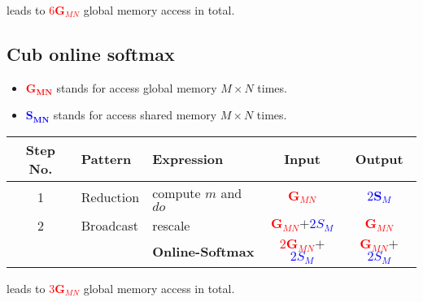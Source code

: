 leads to \textcolor{red}{$6\mathbf{G}_{MN}$} global memory access in total.

\subsection{Cub online softmax}

\begin{itemize}
    \item \textcolor{red}{$\mathbf{G_{MN}}$} stands for access global memory $M\times N$ times.
    \item \textcolor{blue}{$\mathbf{S_{MN}}$} stands for access shared memory $M\times N$ times.
\end{itemize}

\begin{tabular}{c|llcc}
    \toprule
    \textbf{Step No.}&\textbf{Pattern}&\textbf{Expression}&\textbf{Input}&\textbf{Output}\\\midrule
    1 & Reduction & compute $m$ and $do$&\textcolor{red}{$\mathbf{G}_{MN}$}&\textcolor{blue}{$2\mathbf{S}_M$}\\
    2 & Broadcast & rescale&\textcolor{red}{$\mathbf{G}_{MN}$}$+$\textcolor{blue}{$2S_M$}&\textcolor{red}{$\mathbf{G}_{MN}$}\\\midrule
    &&\textbf{\textcolor{byzantium}{Online-Softmax}}&\textcolor{red}{$2\mathbf{G}_{MN}$}$+$\textcolor{blue}{$2S_M$}&\textcolor{red}{$\mathbf{G}_{MN}$}$+$\textcolor{blue}{$2S_M$}\\
    \bottomrule
\end{tabular}

leads to \textcolor{red}{$3\mathbf{G}_{MN}$} global memory access in total.